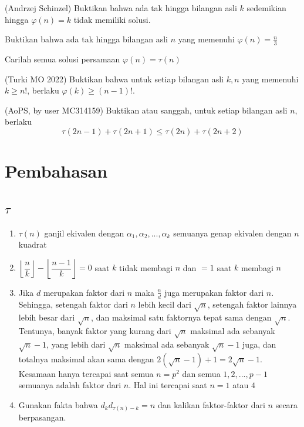 \documentclass[11pt]{scrartcl}
\begin{document}
\begin{problem}
    (Andrzej Schinzel) Buktikan bahwa ada tak hingga bilangan asli $k$ sedemikian hingga $\varphi(n) = k$ tidak memiliki solusi.
\end{problem}

\begin{problem}
    Buktikan bahwa ada tak hingga bilangan asli $n$ yang memenuhi $\varphi(n) = \frac{n}{3}$
\end{problem}

\begin{problem}
    Carilah semua solusi persamaan $\varphi(n) = \tau(n)$
\end{problem}

\begin{problem}
    (Turki MO 2022) Buktikan bahwa untuk setiap bilangan asli $k, n$ yang memenuhi $k \geq n!$, berlaku $\varphi(k) \geq (n - 1)!$.
\end{problem}

\begin{problem}
    (AoPS, by user MC314159) Buktikan atau sanggah, untuk setiap bilangan asli $n$, berlaku $$\tau(2n-1)+\tau(2n+1) \leq \tau(2n)+\tau(2n+2)$$
\end{problem}

\newpage
\section{Pembahasan}
\subsection{$\tau$}
\begin{enumerate}
    \item  $\tau(n)$ ganjil ekivalen dengan $\alpha_1, \alpha_2, ..., \alpha_k$ semuanya genap ekivalen dengan $n$ kuadrat
    \item $\left\lfloor \dfrac{n}{k} \right\rfloor - \left\lfloor \dfrac{n - 1}{k} \right\rfloor = 0$ saat $k$ tidak membagi $n$ dan $= 1$ saat $k$ membagi $n$
    \item Jika $d$ merupakan faktor dari $n$ maka $\frac{n}{d}$ juga merupakan faktor dari $n$. Sehingga, setengah faktor dari $n$ lebih kecil dari $\sqrt{n}$, setengah faktor lainnya lebih besar dari $\sqrt{n}$, dan maksimal satu faktornya tepat sama dengan $\sqrt{n}$. Tentunya, banyak faktor yang kurang dari $\sqrt{n}$ maksimal ada sebanyak $\sqrt{n} - 1$, yang lebih dari $\sqrt{n}$ maksimal ada sebanyak $\sqrt{n} - 1$ juga, dan totalnya maksimal akan sama dengan $2(\sqrt{n} - 1) + 1 = 2\sqrt{n} - 1$. Kesamaan hanya tercapai saat semua $n = p^2$ dan semua $1, 2, ..., p - 1$ semuanya adalah faktor dari $n$. Hal ini tercapai saat $n = 1$ atau $4$
    \item Gunakan fakta bahwa $d_kd_{\tau(n) - k} = n$ dan kalikan faktor-faktor dari $n$ secara berpasangan.
\end{enumerate}
\end{document}
